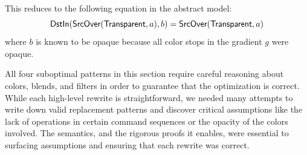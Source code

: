 \documentclass[main.tex]{subfiles}
\begin{document}
\noindent
This reduces to the following equation in the abstract model:
\[
\textsf{DstIn}(\textsf{SrcOver}(\textsf{Transparent}, a), b) = \textsf{SrcOver}(\textsf{Transparent}, a)
\]
\noindent
  where $b$ is known to be opaque
  because all color stops in the gradient $g$ were opaque.

All four suboptimal patterns in this section
  require careful reasoning about colors, blends, and filters
  in order to guarantee that the optimization is correct.
While each high-level rewrite is straightforward,
  we needed many attempts to write down valid replacement patterns
  and discover critical assumptions
  like the lack of \SaveLayer operations in certain command sequences
  or the opacity of the colors involved.
The \muskia semantics, and the rigorous proofs it enables,
  were essential to surfacing assumptions
  and ensuring that each rewrite was correct.
\end{document}
